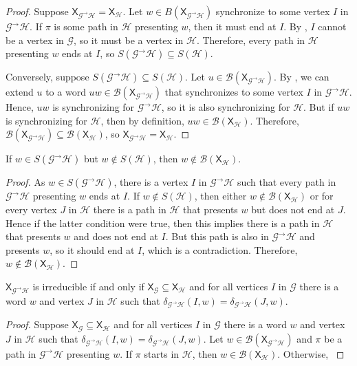 \documentclass[hidelinks]{article}
\newcommand{\Gc}{\mathcal{G}}  %
\newcommand{\Hc}{\mathcal{H}}  %
\newcommand{\Bc}{\mathcal{B}}
\newcommand{\GtH}{{\Gc^\to\Hc}}
\newcommand{\shift}[1]{\mathsf{X}_{#1}}
\theoremstyle{definition}
\begin{document}
\begin{proof}
    Suppose \(\shift{\GtH} = \shift{\Hc}\). Let \(w \in B(\shift{\GtH})\) synchronize to some vertex \(I\)
    in \(\GtH\).
    If \(\pi\) is some path in \(\Hc\) presenting \(w\), then it must end at \(I\). By 
    , \(I\) cannot be a vertex in \(\Gc\), so it must be a vertex in \(\Hc\).
    Therefore, every path in \(\Hc\) presenting \(w\) ends at \(I\), so \(S(\GtH) \subseteq S(\Hc)\).

    Conversely, suppose \(S(\GtH) \subseteq S(\Hc)\). Let \(u \in \Bc(\shift{\GtH})\).
    By , we can extend \(u\) to a word \(uw \in \Bc(\shift{\GtH})\) that 
    synchronizes to some vertex \(I\) in \(\GtH\). Hence, \(uw\) is synchronizing 
    for \(\GtH\), so it is also synchronizing for \(\Hc\). But if \(uw\) is synchronizing for
    \(\Hc\), then by definition, \(uw \in \Bc(\shift{\Hc})\). Therefore, \(\Bc(\shift{\GtH}) \subseteq \Bc(\shift{\Hc})\),
    so \(\shift{\GtH} = \shift{\Hc}\).
\end{proof}

\begin{theorem}
    If \(w \in S(\GtH)\) but \(w \notin S(\Hc)\), then \(w \notin \Bc(\shift{\Hc})\). 
\end{theorem}

\begin{proof}
    As \(w \in S(\GtH)\), there is a vertex \(I\) in \(\GtH\) such that every path in 
    \(\GtH\) presenting \(w\) ends at \(I\).
    If \(w \notin S(\Hc)\), then either 
    \(w \notin \Bc(\shift{\Hc})\) or for every vertex \(J\) in \(\Hc\) there is a path
    in \(\Hc\) that presents \(w\) but does not end at \(J\). Hence if the latter 
    condition were true, then this implies there is a path in \(\Hc\) that presents \(w\) 
    and does not end at \(I\). But this path is also in \(\GtH\) and presents \(w\), so it 
    should end at \(I\), which is a contradiction. Therefore, \(w \notin \Bc(\shift{\Hc})\).
\end{proof}

\begin{theorem}
    \(\shift{\GtH}\) is irreducible if and only if \(\shift{\Gc} \subseteq \shift{\Hc}\) and for all vertices 
    \(I\) in \(\Gc\) there is a word \(w\) and vertex \(J\) in \(\Hc\) such that \(\delta_\GtH(I, w) = \delta_\GtH(J, w)\).
\end{theorem}

\begin{proof}
    Suppose \(\shift{\Gc} \subseteq \shift{\Hc}\) and for all vertices 
    \(I\) in \(\Gc\) there is a word \(w\) and vertex \(J\) in \(\Hc\) such that \(\delta_\GtH(I, w) = \delta_\GtH(J, w)\).
    Let \(w \in \Bc(\shift{\GtH})\) and \(\pi\) be a path in \(\GtH\) presenting \(w\). 
    If \(\pi\) starts in \(\Hc\), then \(w \in \Bc(\shift{\Hc})\). Otherwise, \(\)
\end{proof}
\end{document}
